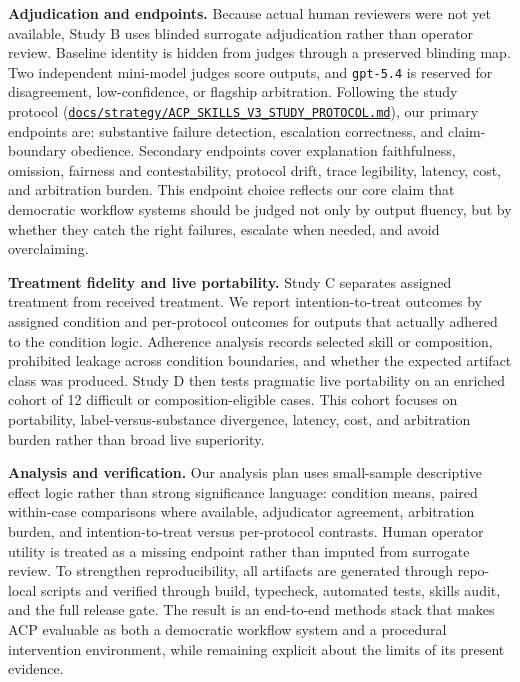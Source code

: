 \documentclass[11pt]{article}
\newcommand{\repobase}{https://github.com/davidkimai/acp}
\newcommand{\repofile}[2]{\href{\repobase/blob/main/#1}{\nolinkurl{#2}}}
\begin{document}
\vspace{0.1in}
\textbf{Adjudication and endpoints.} Because actual human reviewers were not yet available, Study B uses blinded surrogate adjudication rather than operator review. Baseline identity is hidden from judges through a preserved blinding map. Two independent mini-model judges score outputs, and \texttt{gpt-5.4} is reserved for disagreement, low-confidence, or flagship arbitration. Following the study protocol (\repofile{docs/strategy/ACP_SKILLS_V3_STUDY_PROTOCOL.md}{docs/strategy/ACP_SKILLS_V3_STUDY_PROTOCOL.md}), our primary endpoints are: substantive failure detection, escalation correctness, and claim-boundary obedience. Secondary endpoints cover explanation faithfulness, omission, fairness and contestability, protocol drift, trace legibility, latency, cost, and arbitration burden. This endpoint choice reflects our core claim that democratic workflow systems should be judged not only by output fluency, but by whether they catch the right failures, escalate when needed, and avoid overclaiming.

\vspace{0.1in}
\textbf{Treatment fidelity and live portability.} Study C separates assigned treatment from received treatment. We report intention-to-treat outcomes by assigned condition and per-protocol outcomes for outputs that actually adhered to the condition logic. Adherence analysis records selected skill or composition, prohibited leakage across condition boundaries, and whether the expected artifact class was produced. Study D then tests pragmatic live portability on an enriched cohort of 12 difficult or composition-eligible cases. This cohort focuses on portability, label-versus-substance divergence, latency, cost, and arbitration burden rather than broad live superiority.

\vspace{0.1in}
\textbf{Analysis and verification.} Our analysis plan uses small-sample descriptive effect logic rather than strong significance language: condition means, paired within-case comparisons where available, adjudicator agreement, arbitration burden, and intention-to-treat versus per-protocol contrasts. Human operator utility is treated as a missing endpoint rather than imputed from surrogate review. To strengthen reproducibility, all artifacts are generated through repo-local scripts and verified through build, typecheck, automated tests, skills audit, and the full release gate. The result is an end-to-end methods stack that makes ACP evaluable as both a democratic workflow system and a procedural intervention environment, while remaining explicit about the limits of its present evidence.
\end{document}
